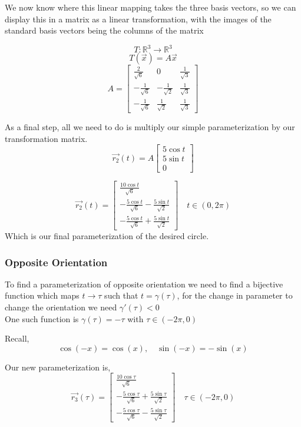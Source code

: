\documentclass{article}
\begin{document}
We now know where this linear mapping takes the three basis vectors, so we can display this in a matrix as a linear transformation, with the images
of the standard basis vectors being the columns of the matrix

\[
T: \mathbb{R}^3 \rightarrow \mathbb{R}^3
\]
\[
T(\vec{x}) = A\vec{x}
\]
\[
A = \begin{bmatrix}
    \frac{2}{\sqrt{6}} & 0 & \frac{1}{\sqrt{3}}   \\
    -\frac{1}{\sqrt{6}} & -\frac{1}{\sqrt{2}} & \frac{1}{\sqrt{3}} \\
    -\frac{1}{\sqrt{6}} & \frac{1}{\sqrt{2}} & \frac{1}{\sqrt{3}} 
\end{bmatrix}
\]

\newpage
As a final step, all we need to do is multiply our simple parameterization
by our transformation matrix.
\[
\vec{r_2}(t) = A \begin{bmatrix}
    5\cos t \\
    5 \sin t \\
    0
\end{bmatrix}
\]

\[
\vec{r_2}(t) = \begin{bmatrix}
    \frac{10\cos t}{\sqrt{6}}  \\
    -\frac{5\cos t}{\sqrt{6}} - \frac{5 \sin t}{\sqrt{2}} \\
    -\frac{5\cos t}{\sqrt{6}} + \frac{5 \sin t}{\sqrt{2}}
\end{bmatrix} \quad t \in (0,2\pi)
\]
Which is our final parameterization of the desired circle.

\subsubsection*{Opposite Orientation}

To find a parameterization of opposite orientation we need to find a bijective function which maps \(t \rightarrow \tau\) 
such that \(t = \gamma(\tau)\), for the change in parameter to change the orientation we need \(\gamma '(\tau) < 0\)
\\

One such function is \(\gamma(\tau) = - \tau\) with \(\tau \in (-2\pi , 0)\)

Recall, 
\[
\cos (-x) = \cos (x), \quad \sin(-x) = -\sin(x)
\]

Our new parameterization is,
\[
\vec{r_3}(\tau) = \begin{bmatrix}
    \frac{10\cos \tau}{\sqrt{6}}  \\
    -\frac{5\cos \tau}{\sqrt{6}} + \frac{5 \sin \tau}{\sqrt{2}} \\
    -\frac{5\cos \tau}{\sqrt{6}} - \frac{5 \sin \tau}{\sqrt{2}}
\end{bmatrix} \quad \tau \in (-2\pi,0)
\]
\end{document}
